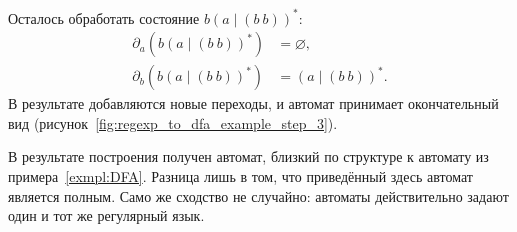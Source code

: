 \begin{example}
    Осталось обработать состояние $b(a \mid (b \ b))^*$:
    \begin{align*}
        \partial_a(b(a \mid (b \ b))^*) & = \varnothing, \\
        \partial_b(b(a \mid (b \ b))^*) & = (a \mid (b \ b))^*.
    \end{align*}
    В результате добавляются новые переходы, и автомат принимает окончательный вид (рисунок~\ref{fig:regexp_to_dfa_example_step_3}).

    \begin{marginfigure}
        \begin{center}
            \scalebox{0.64}{
            
            }
        \end{center}
        \caption{Построение автомата по регулярному выражению с помощью производных: результирующий автомат}
        \label{fig:regexp_to_dfa_example_step_3}
    \end{marginfigure}
\end{example}

В результате построения получен автомат, близкий по структуре к автомату из примера~\ref{exmpl:DFA}.
Разница лишь в том, что приведённый здесь автомат является полным.
Само же сходство не случайно: автоматы действительно задают один и тот же регулярный язык.
